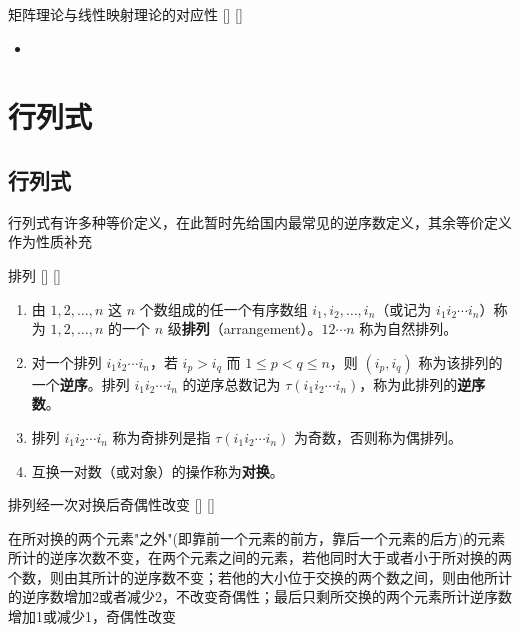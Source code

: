 \documentclass[UTF8]{ctexart}
\begin{document}
		\begin{xmp}
			[]
			{矩阵理论与线性映射理论的对应性}
			[]
			[]

			\begin{itemize}
				\item 
			\end{itemize}
		\end{xmp}
	
\section{行列式}
	
	\subsection{行列式}
        行列式有许多种等价定义，在此暂时先给国内最常见的逆序数定义，其余等价定义作为性质补充
        \begin{dfn}
			[]
			{排列}
			[]
			[]

        \begin{enumerate}
    \item 由 \(1, 2, \ldots, n\) 这 \(n\) 个数组成的任一个有序数组 \(i_1, i_2, \ldots, i_n\)（或记为 \(i_1 i_2 \cdots i_n\)）称为 \(1, 2, \ldots, n\) 的一个 \(n\) 级\textbf{排列}（arrangement）。\(1 2 \cdots n\) 称为自然排列。
    
    \item 对一个排列 \(i_1 i_2 \cdots i_n\)，若 \(i_p > i_q\) 而 \(1 \leq p < q \leq n\)，则 \((i_p, i_q)\) 称为该排列的一个\textbf{逆序}。排列 \(i_1 i_2 \cdots i_n\) 的逆序总数记为 \(\tau(i_1 i_2 \cdots i_n)\)，称为此排列的\textbf{逆序数}。

    \item 排列 \(i_1 i_2 \cdots i_n\) 称为奇排列是指 \(\tau(i_1 i_2 \cdots i_n)\) 为奇数，否则称为偶排列。

    \item 互换一对数（或对象）的操作称为\textbf{对换}。
        \end{enumerate}
        \end{dfn}
        \begin{ppt}
			[]
			{排列经一次对换后奇偶性改变}
			[]
			[]
        \end{ppt}
        \begin{prf}
            在所对换的两个元素"之外"(即靠前一个元素的前方，靠后一个元素的后方)的元素所计的逆序次数不变，在两个元素之间的元素，若他同时大于或者小于所对换的两个数，则由其所计的逆序数不变；若他的大小位于交换的两个数之间，则由他所计的逆序数增加2或者减少2，不改变奇偶性；最后只剩所交换的两个元素所计逆序数增加1或减少1，奇偶性改变
        \end{prf}
\end{document}
